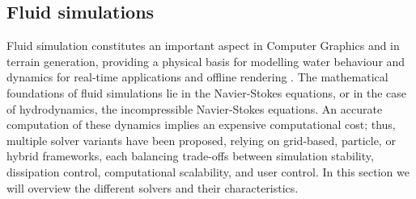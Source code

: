 
\subsection{Fluid simulations}

Fluid simulation constitutes an important aspect in Computer Graphics and in terrain generation, providing a physical basis for modelling water behaviour and dynamics for real-time applications and offline rendering \cite{Wang2024}. The mathematical foundations of fluid simulations lie in the Navier-Stokes equations, or in the case of hydrodynamics, the incompressible Navier-Stokes equations. An accurate computation of these dynamics implies an expensive computational cost; thus, multiple solver variants have been proposed, relying on grid-based, particle, or hybrid frameworks, each balancing trade-offs between simulation stability, dissipation control, computational scalability, and user control. In this section we will overview the different solvers and their characteristics.





